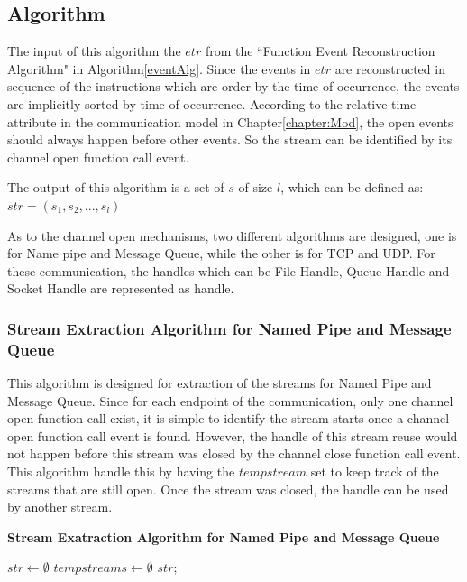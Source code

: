 \subsection{Algorithm}
The input of this algorithm the $etr$ from the ``Function Event Reconstruction Algorithm" in Algorithm\ref{eventAlg}. Since the events in $etr$ are reconstructed in sequence of the instructions which are order by the time of occurrence, the events are implicitly sorted by time of occurrence. According to the relative time attribute in the communication model in Chapter\ref{chapter:Mod}, the open events should always happen before other events. So the stream can be identified by its channel open function call event. 

The output of this algorithm is a set of $s$ of size $l$, which can be defined as:
$str = (s_1, s_2, ..., s_l)$

As to the channel open mechanisms, two different algorithms are designed, one is for Name pipe and Message Queue, while the other is for TCP and UDP. For these communication, the handles which can be File Handle, Queue Handle and Socket Handle are represented as handle.

\subsubsection{Stream Extraction Algorithm for Named Pipe and Message Queue}
This algorithm is designed for extraction of the streams for Named Pipe and Message Queue. Since for each endpoint of the communication, only one channel open function call exist, it is simple to identify the stream starts once a channel open function call event is found. However, the handle of this stream reuse would not happen before this stream was closed by the channel close function call event. This algorithm handle this by having the $tempstream$ set to keep track of the streams that are still open. Once the stream was closed, the handle can be used by another stream.
\begin{algorithm}[H]
\DontPrintSemicolon
\caption{{\bf Stream Exatraction Algorithm for Named Pipe and Message Queue} \label{endpointIdentAlg}}
$str \leftarrow \emptyset$\; 
$tempstreams \leftarrow \emptyset$\; \;  
\KwRet $str$;\;
\end{algorithm} 

